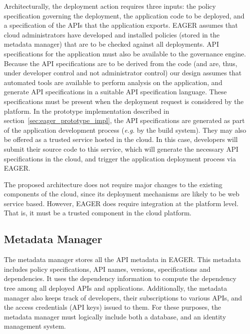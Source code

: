 Architecturally, the deployment action requires three inputs: the policy
specification governing the deployment, the application code to be deployed, and a
specification of the APIs that the application exports.
EAGER assumes that cloud administrators have developed and installed policies
(stored in the metadata manager)
that are to be checked against all deployments.  API specifications for the
application must also be available to the governance engine.  Because the API
specifications are to be derived from the code (and are, thus, under developer
control and not administrator control) our design assumes that automated
tools are available
to perform analysis on the application, and
generate API specifications in a suitable API specification language. These
specifications must be present
when the deployment request is considered by the platform.  In the prototype
implementation described in section~\ref{sec:eager_prototype_impl}, the API specifications are
generated as part of the application development process ({\em e.g.} by the
build system).  They may also
be offered as a trusted service hosted in the cloud. 
In this case, developers will submit their source code
to this service, which will generate the necessary API specifications in the cloud, and trigger
the application deployment process via EAGER.

The proposed architecture does not require major changes to the 
existing components of the cloud, since its deployment mechanisms are likely to
be web service based.  However, EAGER does require integration at the platform level.
That is, it must be a trusted component in the cloud platform. 

\subsection{Metadata Manager}
The metadata manager stores all the API metadata in EAGER. This metadata 
includes policy specifications,  API names, versions, specifications and 
dependencies.
It uses the dependency information to compute the dependency tree 
among 
all deployed APIs and applications. Additionally, the metadata manager
also keeps track of developers, their subscriptions to various APIs, 
and the access credentials (API keys) issued to them. 
For these purposes,
the metadata manager must logically include both a database,
and an identity management system.

